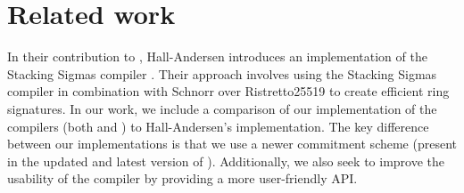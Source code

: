 \section{Related work}
\label{sec:related_work}
In their contribution to \cite{StackingSigmas}, Hall-Andersen introduces an implementation of the Stacking Sigmas compiler \cite{MHAStackSig}. Their approach involves using the Stacking Sigmas compiler in combination with Schnorr over Ristretto25519 \cite{ristretto_web} to create efficient ring signatures. In our work, we include a comparison of our implementation of the compilers (both \cite{CDS94} and \cite{StackingSigmas}) to Hall-Andersen's implementation. 
The key difference between our implementations is that we use a newer commitment scheme (present in the updated and latest version of 
\cite{StackingSigmas}). Additionally, we also seek to improve the usability of the compiler by providing a more user-friendly API. 



